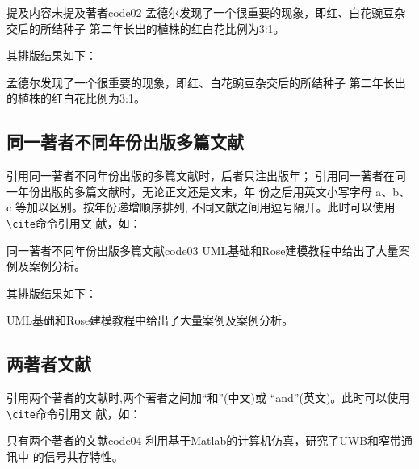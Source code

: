 \documentclass{ctexbook}
\newcommand\cs[1]{\texttt{\textbackslash#1}}
\begin{document}
\begin{codetex}{提及内容未提及著者}{code02}
  孟德尔发现了一个很重要的现象，即红、白花豌豆杂交后的所结种子
  第二年长出的植株的红白花比例为3:1\cite{fzx1962}。%
\end{codetex}

其排版结果如下：

\begin{center}
  \begin{boxedminipage}{0.8\textwidth}
    \small
    孟德尔发现了一个很重要的现象，即红、白花豌豆杂交后的所结种子
      第二年长出的植株的红白花比例为3:1\cite{fzx1962}。%
  \end{boxedminipage}
\end{center}

\subsection{同一著者不同年份出版多篇文献}
引用同一著者不同年份出版的多篇文献时，后者只注出版年；
引用同一著者在同一年份出版的多篇文献时，无论正文还是文末，年
份之后用英文小写字母 a、b、c 等加以区别。按年份递增顺序排列,
不同文献之间用逗号隔开。此时可以使用\cs{cite}命令引用文
献，如：

\begin{codetex}{同一著者不同年份出版多篇文献}{code03}
  UML基础和Rose建模教程中给出了大量案例及案例分析\cite{蔡敏2006a--,蔡敏2006b--}。%
\end{codetex}

其排版结果如下：

\begin{center}
  \begin{boxedminipage}{0.9\textwidth}
    \small
    UML基础和Rose建模教程中给出了大量案例及案例分析\cite{蔡敏2006a--,蔡敏2006b--}。%
  \end{boxedminipage}
\end{center}


\subsection{两著者文献}

引用两个著者的文献时,两个著者之间加\enquote{和}(中文)或
\enquote{and}(英文)。此时可以使用\cs{cite}命令引用文
献，如：

\begin{codetex}{只有两个著者的文献}{code04}
  利用基于Matlab的计算机仿真\cite{郭文彬2006--}，研究了UWB和窄带通讯中
  的信号共存特性\cite{Chiani2009-231-254}。%
\end{codetex}
\end{document}
